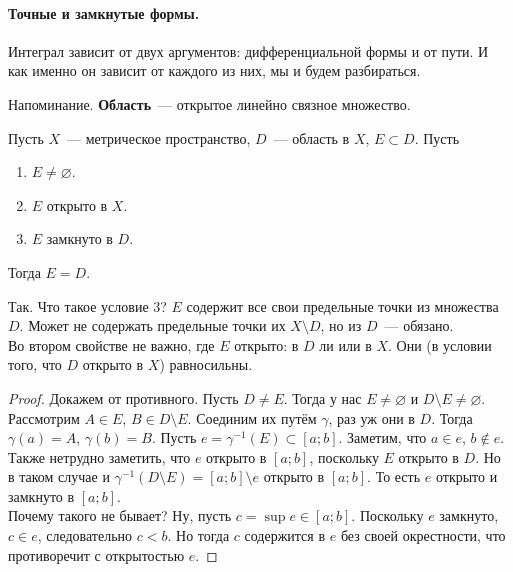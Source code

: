 \documentclass{article}
\begin{document}
    \paragraph{Точные и замкнутые формы.}
    \begin{remark}
        Интеграл зависит от двух аргументов: дифференциальной формы и от пути. И как именно он зависит от каждого из них, мы и будем разбираться.
    \end{remark}
    \begin{definition}
        Напоминание. \textbf{Область}~--- открытое линейно связное множество.
    \end{definition}
    \begin{lemma}
        \label{Линейно связное пространство связно}
        Пусть $X$~--- метрическое пространство, $D$~--- область в $X$, $E\subset D$. Пусть
        \begin{enumerate}
            \item $E\neq\varnothing$.
            \item $E$ открыто в $X$.
            \item $E$ замкнуто в $D$.
        \end{enumerate}
        Тогда $E=D$.
    \end{lemma}
    \begin{remark}
        Так. Что такое условие 3? $E$ содержит все свои предельные точки из множества $D$. Может не содержать предельные точки их $X\setminus D$, но из $D$~--- обязано.\\
        Во втором свойстве не важно, где $E$ открыто: в $D$ ли или в $X$. Они (в условии того, что $D$ открыто в $X$) равносильны.
    \end{remark}
    \begin{proof}
        Докажем от противного. Пусть $D\neq E$. Тогда у нас $E\neq\varnothing$ и $D\setminus E\neq\varnothing$.\\
        Рассмотрим $A\in E$, $B\in D\setminus E$. Соединим их путём $\gamma$, раз уж они в $D$. Тогда $\gamma(a)=A$, $\gamma(b)=B$. Пусть $e=\gamma^{-1}(E)\subset[a;b]$. Заметим, что $a\in e$, $b\notin e$. Также нетрудно заметить, что $e$ открыто в $[a;b]$, поскольку $E$ открыто в $D$. Но в таком случае и $\gamma^{-1}(D\setminus E)=[a;b]\setminus e$ открыто в $[a;b]$. То есть $e$ открыто и замкнуто в $[a;b]$.\\
        Почему такого не бывает? Ну, пусть $c=\sup e\in[a;b]$. Поскольку $e$ замкнуто, $c\in e$, следовательно $c<b$. Но тогда $c$ содержится в $e$ без своей окрестности, что противоречит с открытостью $e$.
    \end{proof}
\end{document}
